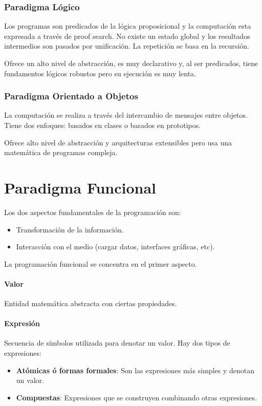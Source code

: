 \documentclass[10pt,a4paper]{article}
\begin{document}
\subsubsection{Paradigma Lógico}
Los programas son predicados de la lógica proposicional y la computación esta expresada a través de proof search. No existe un estado global y los resultados intermedios son pasados por unificación. La repetición se basa en la recursión.

Ofrece un alto nivel de abstracción, es muy declarativo y, al ser predicados, tiene fundamentos lógicos robustos pero su ejecución es muy lenta.

\subsubsection{Paradigma Orientado a Objetos}
La computación se realiza a través del intercambio de mensajes entre objetos. Tiene dos enfoques: basados en clases o basados en prototipos.

Ofrece alto nivel de abstracción y arquitecturas extensibles pero usa una matemática de programas compleja.


\newpage
\section{Paradigma Funcional}
Los dos aspectos fundamentales de la programación son:
\begin{itemize}
	\item Transformación de la información.
	\item Interacción con el medio (cargar datos, interfaces gráficas, etc).
\end{itemize}
La programación funcional se concentra en el primer aspecto.

\paragraph{Valor} Entidad matemática abstracta con ciertas propiedades.

\paragraph{Expresión} Secuencia de símbolos utilizada para denotar un valor. Hay dos tipos de expresiones:
\begin{itemize}
	\item \textbf{Atómicas ó formas formales}: Son las expresiones más simples y denotan un valor.
	\item \textbf{Compuestas}: Expresiones que se construyen combinando otras expresiones.
\end{itemize}
\end{document}
